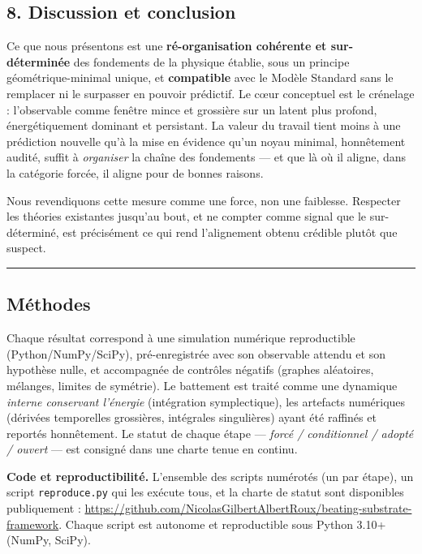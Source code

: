 \documentclass[11pt]{article}
\begin{document}
\hypertarget{discussion-et-conclusion}{%
\subsection{8. Discussion et
conclusion}\label{discussion-et-conclusion}}

Ce que nous présentons est une \textbf{ré-organisation cohérente et
sur-déterminée} des fondements de la physique établie, sous un principe
géométrique-minimal unique, et \textbf{compatible} avec le Modèle
Standard sans le remplacer ni le surpasser en pouvoir prédictif. Le cœur
conceptuel est le crénelage : l'observable comme fenêtre mince et
grossière sur un latent plus profond, énergétiquement dominant et
persistant. La valeur du travail tient moins à une prédiction nouvelle
qu'à la mise en évidence qu'un noyau minimal, honnêtement audité, suffit
à \emph{organiser} la chaîne des fondements --- et que là où il aligne,
dans la catégorie forcée, il aligne pour de bonnes raisons.

Nous revendiquons cette mesure comme une force, non une faiblesse.
Respecter les théories existantes jusqu'au bout, et ne compter comme
signal que le sur-déterminé, est précisément ce qui rend l'alignement
obtenu crédible plutôt que suspect.

\begin{center}\rule{0.5\linewidth}{0.5pt}\end{center}

\hypertarget{muxe9thodes}{%
\subsection{Méthodes}\label{muxe9thodes}}

Chaque résultat correspond à une simulation numérique reproductible
(Python/NumPy/SciPy), pré-enregistrée avec son observable attendu et son
hypothèse nulle, et accompagnée de contrôles négatifs (graphes
aléatoires, mélanges, limites de symétrie). Le battement est traité
comme une dynamique \emph{interne conservant l'énergie} (intégration
symplectique), les artefacts numériques (dérivées temporelles
grossières, intégrales singulières) ayant été raffinés et reportés
honnêtement. Le statut de chaque étape --- \emph{forcé / conditionnel /
adopté / ouvert} --- est consigné dans une charte tenue en continu.

\textbf{Code et reproductibilité.} L'ensemble des scripts numérotés (un
par étape), un script \texttt{reproduce.py} qui les exécute tous, et la
charte de statut sont disponibles publiquement :
\url{https://github.com/NicolasGilbertAlbertRoux/beating-substrate-framework}.
Chaque script est autonome et reproductible sous Python 3.10+ (NumPy,
SciPy).
\end{document}
